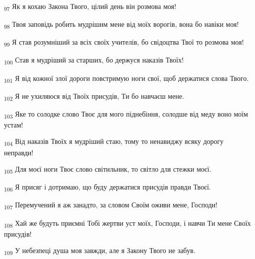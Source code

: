 \begin{tcolorbox}
\textsubscript{97} Як я кохаю Закона Твого, цілий день він розмова моя!
\end{tcolorbox}
\begin{tcolorbox}
\textsubscript{98} Твоя заповідь робить мудрішим мене від моїх ворогів, вона бо навіки моя!
\end{tcolorbox}
\begin{tcolorbox}
\textsubscript{99} Я став розумніший за всіх своїх учителів, бо свідоцтва Твої то розмова моя!
\end{tcolorbox}
\begin{tcolorbox}
\textsubscript{100} Став я мудріший за старших, бо держуся наказів Твоїх!
\end{tcolorbox}
\begin{tcolorbox}
\textsubscript{101} Я від кожної злої дороги повстримую ноги свої, щоб держатися слова Твого.
\end{tcolorbox}
\begin{tcolorbox}
\textsubscript{102} Я не ухиляюся від Твоїх присудів, Ти бо навчаєш мене.
\end{tcolorbox}
\begin{tcolorbox}
\textsubscript{103} Яке то солодке слово Твоє для мого піднебіння, солодше від меду воно моїм устам!
\end{tcolorbox}
\begin{tcolorbox}
\textsubscript{104} Від наказів Твоїх я мудріший стаю, тому то ненавиджу всяку дорогу неправди!
\end{tcolorbox}
\begin{tcolorbox}
\textsubscript{105} Для моєї ноги Твоє слово світильник, то світло для стежки моєї.
\end{tcolorbox}
\begin{tcolorbox}
\textsubscript{106} Я присяг і дотримаю, що буду держатися присудів правди Твоєї.
\end{tcolorbox}
\begin{tcolorbox}
\textsubscript{107} Перемучений я аж занадто, за словом Своїм оживи мене, Господи!
\end{tcolorbox}
\begin{tcolorbox}
\textsubscript{108} Хай же будуть приємні Тобі жертви уст моїх, Господи, і навчи Ти мене Своїх присудів!
\end{tcolorbox}
\begin{tcolorbox}
\textsubscript{109} У небезпеці душа моя завжди, але я Закону Твого не забув.
\end{tcolorbox}
